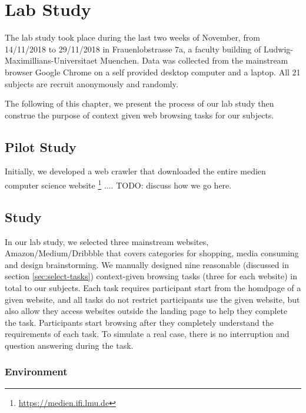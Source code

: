\section{Lab Study}
\label{ch:exp}

The lab study took place during the last two weeks of November, from 14/11/2018 to 29/11/2018
in Frauenlobstrasse 7a, a faculty building of Ludwig-Maximillians-Universitaet Muenchen.
Data was collected from the mainstream browser Google Chrome on a self provided 
desktop computer and a laptop. All 21 subjects are recruit anonymously and randomly.

The following of this chapter, we present the process of our lab study then construe the purpose 
of context given web browsing tasks for our subjects.


\subsection{Pilot Study}

Initially, we developed a web crawler that downloaded the entire medien computer science website 
\footnote{\url{https://medien.ifi.lmu.de}}
.... TODO: discuss how we go here.

\subsection{Study}

In our lab study, we selected three mainstream websites, Amazon/Medium/Dribbble 
that covers categories for shopping, media consuming and design brainstorming. 
We manually designed nine reasonable (discussed in section \ref{sec:select-tasks})
context-given browsing tasks (three for each website) in total to our subjects.
Each task requires participant start from the homdpage of a given website, and
all tasks do not restrict participants use the given website, but also allow they 
access websites outside the landing page to help they complete the task.
Participants start browsing after they completely understand the requirements of each task.
To simulate a real case, there is no interruption and question answering during the task.

\subsubsection{Environment}

